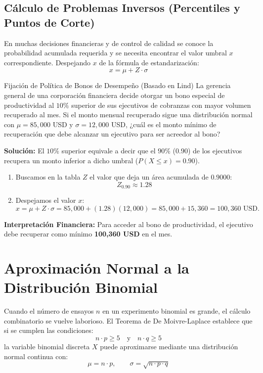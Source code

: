 \subsection{Cálculo de Problemas Inversos (Percentiles y Puntos de Corte)}
En muchas decisiones financieras y de control de calidad se conoce la probabilidad acumulada requerida y se necesita encontrar el valor umbral $x$ correspondiente. Despejando $x$ de la fórmula de estandarización:
\begin{equation}
    x = \mu + Z \cdot \sigma
\end{equation}

\begin{ejemplo}{Fijación de Política de Bonos de Desempeño (Basado en Lind)}
La gerencia general de una corporación financiera decide otorgar un bono especial de productividad al $10\%$ superior de sus ejecutivos de cobranzas con mayor volumen recuperado al mes. Si el monto mensual recuperado sigue una distribución normal con $\mu = 85{,}000$ USD y $\sigma = 12{,}000$ USD, ¿cuál es el monto mínimo de recuperación que debe alcanzar un ejecutivo para ser acreedor al bono?

\tcbline
\textbf{Solución:}
El $10\%$ superior equivale a decir que el $90\%$ ($0.90$) de los ejecutivos recupera un monto inferior a dicho umbral ($P(X \le x) = 0.90$).
\begin{enumerate}
    \item Buscamos en la tabla $Z$ el valor que deja un área acumulada de $0.9000$:
    \[
    Z_{0.90} \approx 1.28
    \]
    \item Despejamos el valor $x$:
    \[
    x = \mu + Z \cdot \sigma = 85{,}000 + (1.28)(12{,}000) = 85{,}000 + 15{,}360 = 100{,}360 \text{ USD.}
    \]
\end{enumerate}
\textbf{Interpretación Financiera:} Para acceder al bono de productividad, el ejecutivo debe recuperar como mínimo \textbf{100,360 USD} en el mes.
\end{ejemplo}

\section{Aproximación Normal a la Distribución Binomial}
Cuando el número de ensayos $n$ en un experimento binomial es grande, el cálculo combinatorio se vuelve laborioso. El Teorema de De Moivre-Laplace establece que si se cumplen las condiciones:
\begin{equation}
    n \cdot p \ge 5 \quad \text{y} \quad n \cdot q \ge 5
\end{equation}
la variable binomial discreta $X$ puede aproximarse mediante una distribución normal continua con:
\begin{equation}
    \mu = n \cdot p, \qquad \sigma = \sqrt{n \cdot p \cdot q}
\end{equation}

